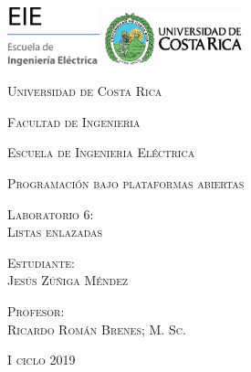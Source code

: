\begin{titlepage}
		\bf
		\centering
		\includegraphics[width=0.20\textwidth]{images/EIE.png}			
		\hspace{7cm} 
		\includegraphics[width=0.30\textwidth]{images/UCR.png}	
		\par
		\vspace{2cm}			
		{\scshape\large Universidad de Costa Rica \par}
		\vspace{0.6cm}
		{\scshape\large Facultad de Ingenieria\par}
		\vspace{0.6cm}
		{\scshape\large Escuela de Ingenieria Eléctrica\par}
		\vspace{0.6cm}
		{\scshape\large Programación bajo plataformas abiertas\par}
		\vspace{1.5cm}		
		{\scshape\large Laboratorio 6:\\ Listas enlazadas \par}
		\vspace{2.5cm}		
		{\scshape\large Estudiante:\\ Jesús Zúñiga Méndez \par}
		\vspace{2.5cm}		
		{\scshape\large Profesor:\\ Ricardo Román Brenes; M. Sc. \par}
		\vspace{2.5cm}
		{\scshape\large I ciclo 2019 \par}
\end{titlepage}

